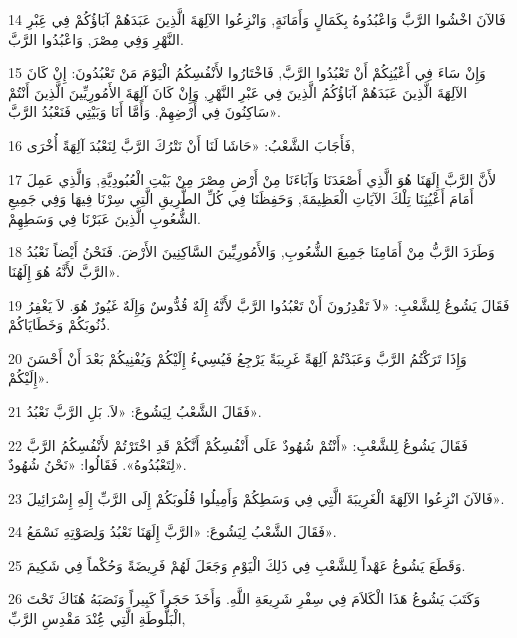 \par 14 فَالآنَ اخْشُوا الرَّبَّ وَاعْبُدُوهُ بِكَمَالٍ وَأَمَانَةٍ, وَانْزِعُوا الآلِهَةَ الَّذِينَ عَبَدَهُمْ آبَاؤُكُمْ فِي عَِبْرِ النَّهْرِ وَفِي مِصْرَ, وَاعْبُدُوا الرَّبَّ.
\par 15 وَإِنْ سَاءَ فِي أَعْيُنِكُمْ أَنْ تَعْبُدُوا الرَّبَّ, فَاخْتَارُوا لأَنْفُسِكُمُ الْيَوْمَ مَنْ تَعْبُدُونَ: إِنْ كَانَ الآلِهَةَ الَّذِينَ عَبَدَهُمْ آبَاؤُكُمُ الَّذِينَ فِي عَبْرِ النَّهْرِ, وَإِنْ كَانَ آلِهَةَ الأَمُورِيِّينَ الَّذِينَ أَنْتُمْ سَاكِنُونَ فِي أَرْضِهِمْ. وَأَمَّا أَنَا وَبَيْتِي فَنَعْبُدُ الرَّبَّ».
\par 16 فَأَجَابَ الشَّعْبُ: «حَاشَا لَنَا أَنْ نَتْرُكَ الرَّبَّ لِنَعْبُدَ آلِهَةً أُخْرَى,
\par 17 لأَنَّ الرَّبَّ إِلَهَنَا هُوَ الَّذِي أَصْعَدَنَا وَآبَاءَنَا مِنْ أَرْضِ مِصْرَ مِنْ بَيْتِ الْعُبُودِيَّةِ, وَالَّذِي عَمِلَ أَمَامَ أَعْيُنِنَا تِلْكَ الآيَاتِ الْعَظِيمَةَ, وَحَفِظَنَا فِي كُلِّ الطَّرِيقِ الَّتِي سِرْنَا فِيهَا وَفِي جَمِيعِ الشُّعُوبِ الَّذِينَ عَبَرْنَا فِي وَسَطِهِمْ.
\par 18 وَطَرَدَ الرَّبُّ مِنْ أَمَامِنَا جَمِيعَ الشُّعُوبِ, وَالأَمُورِيِّينَ السَّاكِنِينَ الأَرْضَ. فَنَحْنُ أَيْضاً نَعْبُدُ الرَّبَّ لأَنَّهُ هُوَ إِلَهُنَا».
\par 19 فَقَالَ يَشُوعُ لِلشَّعْبِ: «لاَ تَقْدِرُونَ أَنْ تَعْبُدُوا الرَّبَّ لأَنَّهُ إِلَهٌ قُدُّوسٌ وَإِلَهٌ غَيُورٌ هُوَ. لاَ يَغْفِرُ ذُنُوبَكُمْ وَخَطَايَاكُمْ.
\par 20 وَإِذَا تَرَكْتُمُ الرَّبَّ وَعَبَدْتُمْ آلِهَةً غَرِيبَةً يَرْجِعُ فَيُسِيءُ إِلَيْكُمْ وَيُفْنِيكُمْ بَعْدَ أَنْ أَحْسَنَ إِلَيْكُمْ».
\par 21 فَقَالَ الشَّعْبُ لِيَشُوعَ: «لاَ. بَلِ الرَّبَّ نَعْبُدُ».
\par 22 فَقَالَ يَشُوعُ لِلشَّعْبِ: «أَنْتُمْ شُهُودٌ عَلَى أَنْفُسِكُمْ أَنَّكُمْ قَدِ اخْتَرْتُمْ لأَنْفُسِكُمُ الرَّبَّ لِتَعْبُدُوهُ». فَقَالُوا: «نَحْنُ شُهُودٌ».
\par 23 فَالآنَ انْزِعُوا الآلِهَةَ الْغَرِيبَةَ الَّتِي فِي وَسَطِكُمْ وَأَمِيلُوا قُلُوبَكُمْ إِلَى الرَّبِّ إِلَهِ إِسْرَائِيلَ».
\par 24 فَقَالَ الشَّعْبُ لِيَشُوعَ: «الرَّبَّ إِلَهَنَا نَعْبُدُ وَلِصَوْتِهِ نَسْمَعُ».
\par 25 وَقَطَعَ يَشُوعُ عَهْداً لِلشَّعْبِ فِي ذَلِكَ الْيَوْمِ وَجَعَلَ لَهُمْ فَرِيضَةً وَحُكْماً فِي شَكِيمَ.
\par 26 وَكَتَبَ يَشُوعُ هَذَا الْكَلاَمَ فِي سِفْرِ شَرِيعَةِ اللَّهِ. وَأَخَذَ حَجَراً كَبِيراً وَنَصَبَهُ هُنَاكَ تَحْتَ الْبَلُّوطَةِ الَّتِي عَُِنْدَ مَقْدِسِ الرَّبِّ,

